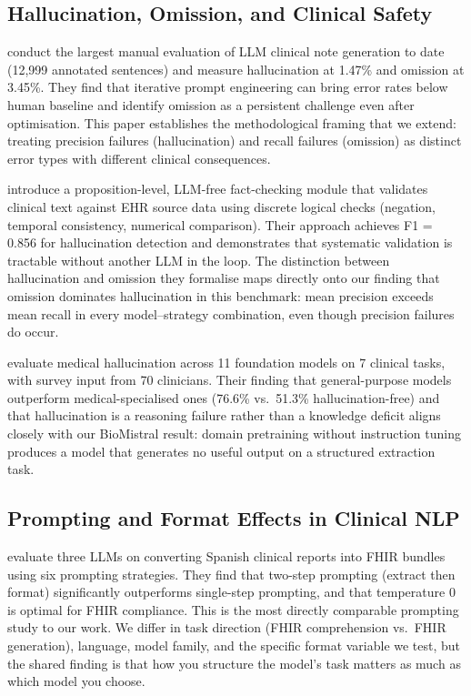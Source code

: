 \subsection{Hallucination, Omission, and Clinical Safety}

\citet{asgari2025clinicalsafety} conduct the largest manual evaluation of LLM clinical
note generation to date (12,999 annotated sentences) and measure hallucination at 1.47\%
and omission at 3.45\%. They find that iterative prompt engineering can bring error
rates below human baseline and identify omission as a persistent challenge even after
optimisation. This paper establishes the methodological framing that we extend:
treating precision failures (hallucination) and recall failures (omission) as distinct
error types with different clinical consequences.

\citet{zeba2025granularfactcheck} introduce a proposition-level, LLM-free fact-checking
module that validates clinical text against EHR source data using discrete logical checks
(negation, temporal consistency, numerical comparison). Their approach achieves F1 = 0.856
for hallucination detection and demonstrates that systematic validation is tractable
without another LLM in the loop. The distinction between hallucination and omission
they formalise maps directly onto our finding that omission dominates hallucination in
this benchmark: mean precision exceeds mean recall in every model--strategy combination,
even though precision failures do occur.

\citet{kim2025medicalhallucination} evaluate medical hallucination across 11 foundation
models on 7 clinical tasks, with survey input from 70 clinicians. Their finding that
general-purpose models outperform medical-specialised ones (76.6\% vs.\ 51.3\%
hallucination-free) and that hallucination is a reasoning failure rather than a knowledge
deficit aligns closely with our BioMistral result: domain pretraining without instruction
tuning produces a model that generates no useful output on a structured extraction task.

\subsection{Prompting and Format Effects in Clinical NLP}

\citet{delaunay2025fhirprompting} evaluate three LLMs on converting Spanish clinical
reports into FHIR bundles using six prompting strategies. They find that two-step
prompting (extract then format) significantly outperforms single-step prompting, and
that temperature 0 is optimal for FHIR compliance. This is the most directly comparable
prompting study to our work. We differ in task direction (FHIR comprehension vs.\
FHIR generation), language, model family, and the specific format variable we test,
but the shared finding is that how you structure the model's task matters as much as
which model you choose.


